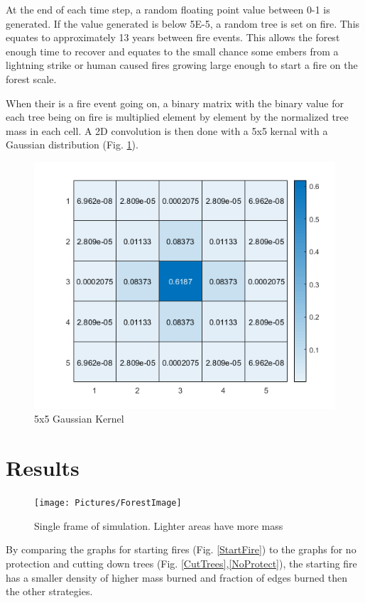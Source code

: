 \documentclass[ aps, pra, reprint, notitlepage ]{revtex4-1}
\begin{document}
At the end of each time step, a random floating point value between 0-1 is generated. If the value generated is below 5E-5, a random tree is set on fire. This equates to approximately 13 years between fire events. This allows the forest enough time to recover and equates to the small chance some embers from a lightning strike or human caused fires growing large enough to start a fire on the forest scale.

When their is a fire event going on, a binary matrix with the binary value for each tree being on fire is multiplied element by element by the normalized tree mass in each cell. A 2D convolution is then done with a 5x5 kernal with a Gaussian distribution (Fig. \ref{GuassDist}).
	
\begin{figure}[ht]
	\includegraphics[scale=0.7]{Pictures/Guassian}
	\caption{\label{GuassDist} 5x5 Gaussian Kernel}
\end{figure}	



\section{\label{Results}Results}

\begin{figure}[ht]
	\texttt{[image: Pictures/ForestImage]}
	\caption{\label{SimulationSlice} Single frame of simulation. Lighter areas have more mass}
\end{figure}

By comparing the graphs for starting fires (Fig. \ref{StartFire}) to the graphs for no protection and cutting down trees (Fig. \ref{CutTrees},\ref{NoProtect}), the starting fire has a smaller density of higher mass burned and fraction of edges burned then the other strategies.
\end{document}
